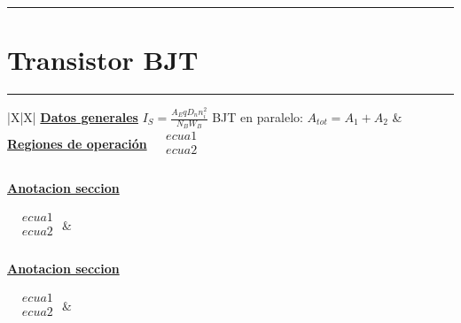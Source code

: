 \documentclass[../main.tex]{subfiles}
\begin{document}
\vspace{0.2in}
\hrule
\vspace{0.2in}
\section{Transistor BJT}
\vspace{0.1in}
\hrule
\begin{xltabular}{\textwidth}{|X|X|}
	\hline
	\underline{\textbf{Datos generales}}
	\newline\newline
	$\displaystyle I_S = \frac{A_EqD_nn_i^2}{N_BW_B}$ \newline\newline
	BJT en paralelo: $A_{tot} = A_1 + A_2$ \newline
	\newline\newline
	&
	\underline{\textbf{Regiones de operación}}
	\newline\newline
	$\begin{aligned}
			 & ecua1 \\
			 & ecua2 \\
		\end{aligned}$
	\newline\newline
	\\
	\hline
	\\
	\hline
	\underline{\textbf{Anotacion seccion}}

	$\begin{aligned}
			 & ecua1 \\
			 & ecua2 \\
		\end{aligned}$
	\newline\newline
	&
	\\
	\hline
	\\
	\hline
	\underline{\textbf{Anotacion seccion}}

	$\begin{aligned}
			 & ecua1 \\
			 & ecua2 \\
		\end{aligned}$
	\newline\newline
	&
	\\
	\hline
\end{xltabular}
\end{document}
